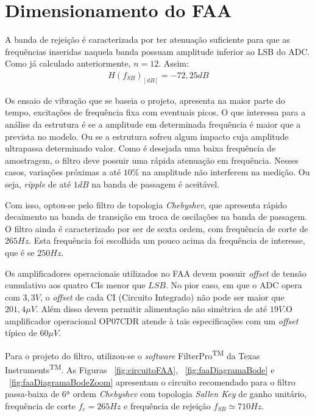 \documentclass[
	12pt,				%
	openright,			%
	twoside,			%
	a4paper,			%
	english,			%
	french,				%
	spanish,			%
	brazil,				%
	]{abntex2}
\begin{document}
	\section{Dimensionamento do FAA}

		A banda de rejeição é caracterizada por ter atenuação
		suficiente para que as frequências inseridas naquela banda possuam amplitude
		inferior ao LSB do ADC. Como já calculado anteriormente, $n=12$. Assim:
		\begin{gather*}
			H(f_{SB})_{[dB]} = -72,25 dB
		\end{gather*}

		Os ensaio de vibração que se baseia o projeto, apresenta na maior parte do tempo, excitações de frequência fixa com eventuais picos. O que
		interessa para a análise da estrutura é se a amplitude em
		determinada frequência é maior que a prevista no modelo. Ou se a
		estrutura sofreu algum impacto cuja amplitude ultrapassa determinado
		valor. Como é desejada uma baixa frequência de amostragem, o filtro deve possuir uma rápida atenuação em frequência. Nesses casos, variações próximas a até $10\%$ na amplitude não interferem na medição. Ou seja, \textit{ripple} de até $1dB$ na banda de passagem é aceitável.

		Com isso, optou-se pelo filtro de topologia
		\textit{Chebyshev}, que apresenta rápido decaimento na banda de transição em troca de oscilações na banda de passagem. O filtro ainda é caracterizado por ser de sexta ordem, com
		frequência de corte de $265Hz$. Esta frequência foi escolhida um
		pouco acima da frequência de interesse, que é se $250Hz$.

		Os amplificadores operacionais utilizados no FAA devem
		possuir \textit{offset} de tensão cumulativo aos quatro CIs
		menor que $LSB$. No pior caso, em que o ADC opera com $3,3V$,
		o \textit{offset} de cada CI (Circuito Integrado) não pode ser
		maior que $201,4\mu V$. Além disso devem permitir alimentação
		não simétrica de até $19V$.O amplificador operacional OP07CDR atende à tais especificações com um \textit{offset} típico de $60\mu V$.

		Para o projeto do filtro, utilizou-se o \textit{software}
		FilterPro\textsuperscript{TM} da Texas
		Instruments\textsuperscript{TM}. As Figuras ~\ref{fig:circuitoFAA},
		~\ref{fig:faaDiagramaBode} e ~\ref{fig:faaDiagramaBodeZoom} apresentam o
		circuito recomendado para o filtro passa-baixa de 6ª ordem
		\textit{Chebyshev} com topologia \textit{Sallen Key} de ganho
		unitário, frequência de corte $f_c = 265Hz$ e frequência de
		rejeição $f_{SB}\simeq 710Hz$.
\end{document}
